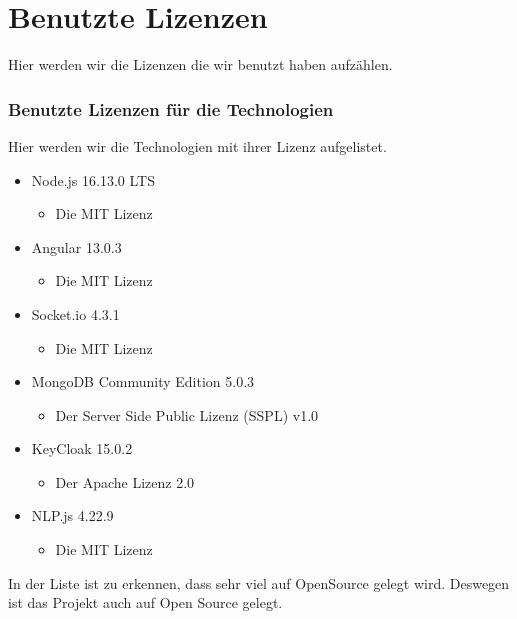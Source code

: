 \section{Benutzte Lizenzen}
Hier werden wir die Lizenzen die wir benutzt haben aufzählen.

\subsubsection{Benutzte Lizenzen für die Technologien}
Hier werden wir die Technologien mit ihrer Lizenz aufgelistet.

\begin{itemize}
    \item Node.js 16.13.0 LTS 
    \begin{itemize}
        \item Die MIT Lizenz
    \end{itemize}
    \item Angular 13.0.3
    \begin{itemize}
        \item Die MIT Lizenz
    \end{itemize}
    \item Socket.io 4.3.1
    \begin{itemize}
        \item Die MIT Lizenz
    \end{itemize}
    \item MongoDB Community Edition 5.0.3
    \begin{itemize}
        \item Der Server Side Public Lizenz (SSPL) v1.0
    \end{itemize}
    \item KeyCloak 15.0.2
    \begin{itemize}
        \item Der Apache Lizenz 2.0
    \end{itemize}
    \item NLP.js 4.22.9
    \begin{itemize}
        \item Die MIT Lizenz
    \end{itemize}
\end{itemize}

\noindent In der Liste ist zu erkennen, dass sehr viel auf OpenSource gelegt wird.
Deswegen ist das Projekt auch auf Open Source gelegt.